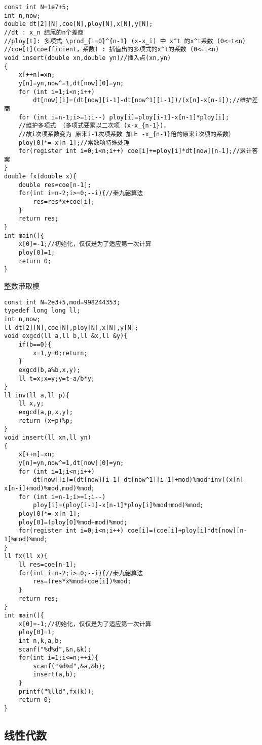 \documentclass[UTF8]{ctexart}
\begin{document}
\begin{lstlisting}
const int N=1e7+5;
int n,now;
double dt[2][N],coe[N],ploy[N],x[N],y[N];
//dt : x_n 结尾的n个差商
//ploy[t]: 多项式 \prod_{i=0}^{n-1} (x-x_i) 中 x^t 的x^t系数 (0<=t<n)
//coe[t](coefficient，系数) : 插值出的多项式的x^t的系数 (0<=t<n) 
void insert(double xn,double yn)//插入点(xn,yn) 
{
    x[++n]=xn;
    y[n]=yn,now^=1,dt[now][0]=yn;
    for (int i=1;i<n;i++) 
        dt[now][i]=(dt[now][i-1]-dt[now^1][i-1])/(x[n]-x[n-i]);//维护差商 
    for (int i=n-1;i>=1;i--) ploy[i]=ploy[i-1]-x[n-1]*ploy[i];
    //维护多项式 （多项式要乘以二次项 (x-x_{n-1})，
    //故i次项系数变为 原来i-1次项系数 加上 -x_{n-1}倍的原来i次项的系数） 
    ploy[0]*=-x[n-1];//常数项特殊处理 
    for(register int i=0;i<n;i++) coe[i]+=ploy[i]*dt[now][n-1];//累计答案 
}
double fx(double x){
    double res=coe[n-1];
    for(int i=n-2;i>=0;--i){//秦九韶算法 
        res=res*x+coe[i];
    }
    return res;
}
int main(){
    x[0]=-1;//初始化，仅仅是为了适应第一次计算 
    ploy[0]=1;
    return 0;
}
\end{lstlisting}

整数带取模

\begin{lstlisting}
const int N=2e3+5,mod=998244353;
typedef long long ll;
int n,now;
ll dt[2][N],coe[N],ploy[N],x[N],y[N];
void exgcd(ll a,ll b,ll &x,ll &y){
    if(b==0){
        x=1,y=0;return;
    }
    exgcd(b,a%b,x,y);
    ll t=x;x=y;y=t-a/b*y;
}
ll inv(ll a,ll p){
    ll x,y;
    exgcd(a,p,x,y);
    return (x+p)%p;
}
void insert(ll xn,ll yn)
{
    x[++n]=xn;
    y[n]=yn,now^=1,dt[now][0]=yn;
    for (int i=1;i<n;i++) 
        dt[now][i]=(dt[now][i-1]-dt[now^1][i-1]+mod)%mod*inv((x[n]-x[n-i]+mod)%mod,mod)%mod;
    for (int i=n-1;i>=1;i--)
        ploy[i]=(ploy[i-1]-x[n-1]*ploy[i]%mod+mod)%mod;
    ploy[0]*=-x[n-1];
    ploy[0]=(ploy[0]%mod+mod)%mod;
    for(register int i=0;i<n;i++) coe[i]=(coe[i]+ploy[i]*dt[now][n-1]%mod)%mod;
}
ll fx(ll x){
    ll res=coe[n-1];
    for(int i=n-2;i>=0;--i){//秦九韶算法 
        res=(res*x%mod+coe[i])%mod;
    }
    return res;
}
int main(){
    x[0]=-1;//初始化，仅仅是为了适应第一次计算 
    ploy[0]=1;
    int n,k,a,b;
    scanf("%d%d",&n,&k);
    for(int i=1;i<=n;++i){
        scanf("%d%d",&a,&b);
        insert(a,b);
    }
    printf("%lld",fx(k));
    return 0;
}
\end{lstlisting}

\subsection{线性代数}
\end{document}
